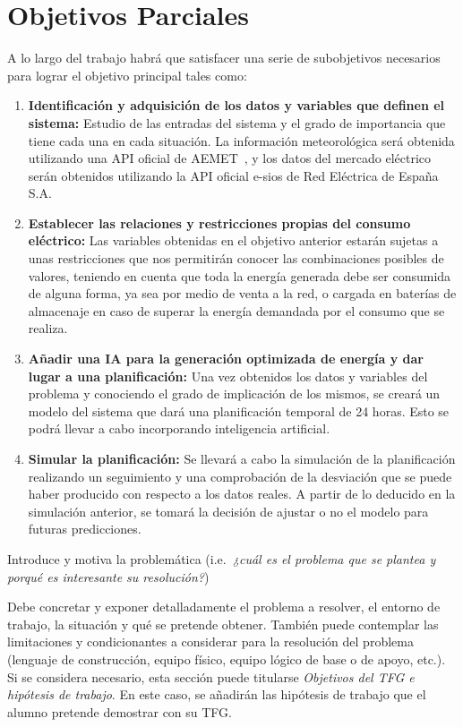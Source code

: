 \section{Objetivos Parciales}
A lo largo del trabajo habrá que satisfacer una serie de subobjetivos necesarios para lograr el objetivo principal tales como:
\begin{enumerate}
	\item \textbf{Identificación y adquisición de los datos y variables que definen el sistema:}
	Estudio de las entradas del sistema y el grado de importancia que tiene cada una en cada situación. La información meteorológica será obtenida utilizando una API oficial de AEMET~\cite{Aemet}, y los datos del mercado eléctrico serán obtenidos utilizando la API oficial e-sios de Red Eléctrica de España S.A.~\cite{Esios}

	\item \textbf{Establecer las relaciones y restricciones propias del consumo eléctrico:}
	Las variables obtenidas en el objetivo anterior estarán sujetas a unas restricciones que nos permitirán conocer las combinaciones posibles de valores, teniendo en cuenta que toda la energía generada debe ser consumida de alguna forma, ya sea por medio de venta a la red, o cargada en baterías de almacenaje en caso de superar la energía demandada por el consumo que se realiza.

	\item \textbf{Añadir una IA para la generación optimizada de energía y dar lugar a una planificación:}
	Una vez obtenidos los datos y variables del problema y conociendo el grado de implicación de los mismos, se creará un modelo del sistema que dará una planificación temporal de 24 horas. Esto se podrá llevar a cabo incorporando inteligencia artificial.

	\item \textbf{Simular la planificación:}
	Se llevará a cabo la simulación de la planificación realizando un seguimiento y una comprobación de la desviación que se puede haber producido con respecto a los datos reales. A partir de lo deducido en la simulación anterior, se tomará la decisión de ajustar o no el modelo para futuras predicciones.
\end{enumerate}

Introduce y motiva la problemática (i.e.\emph{\ ¿cuál es el problema que se plantea y porqué es interesante su resolución?})

Debe concretar y exponer detalladamente el problema a resolver, el entorno de trabajo, la situación y qué se pretende obtener. También puede contemplar las limitaciones y condicionantes a considerar para la resolución del problema (lenguaje de construcción, equipo físico, equipo lógico de base o de apoyo, etc.). Si se considera necesario, esta sección puede titularse \emph{Objetivos del TFG e hipótesis de trabajo}. En este caso, se añadirán las hipótesis de trabajo que el alumno pretende demostrar con su TFG.

